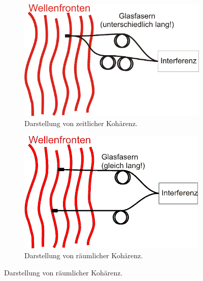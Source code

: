 \begin{figure}[H]
    \begin{subfigure}{.5\textwidth}
        \centering
        \includegraphics[scale=0.15]{images/zeitco.png}
        \caption{Darstellung von zeitlicher Kohärenz.\cite{koharenz}}
        \label{fig:coherencea}
    \end{subfigure}
    \begin{subfigure}{.5\textwidth}
        \centering
        \includegraphics[scale=0.5]{images/raumco.png}
        \caption{Darstellung von räumlicher Kohärenz.\cite{koharenz}}
        \label{fig:coherenceb}
    \end{subfigure}
\end{figure}

